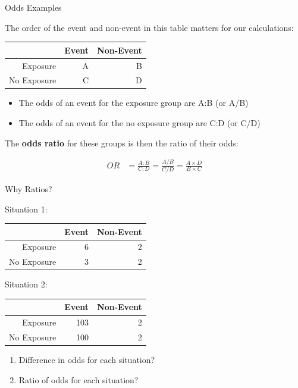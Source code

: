 \documentclass{beamer}
\begin{document}
\begin{frame}{Odds Examples}

The order of the event and non-event in this table matters for our calculations:

\begin{table}[ht]
\centering
\begin{tabular}{|r|r|r|}
  \hline
 & Event & Non-Event \\ 
  \hline
Exposure & A & B \\ \hline
No Exposure & C & D \\
   \hline
\end{tabular}
\end{table}

\begin{itemize}
\item The odds of an event for the exposure group are A:B (or A/B)
\item The odds of an event for the no exposure group are C:D (or C/D)
\end{itemize}

\vspace{6mm}
The \textbf{odds ratio} for these groups is then the ratio of their odds:

\begin{align*}
OR &= \frac{A:B}{C:D} = \frac{A/B}{C/D} = \frac{A \times D}{B \times C}
\end{align*}

\end{frame}


\begin{frame}{Why Ratios?}

Situation 1:
\begin{table}[ht]
\centering
\begin{tabular}{|r|r|r|}
  \hline
 & Event & Non-Event  \\ 
  \hline
Exposure & 6 & 2  \\ \hline
No Exposure & 3 & 2  \\
   \hline
\end{tabular}
\end{table}

Situation 2:
\begin{table}[ht]
\centering
\begin{tabular}{|r|r|r|}
  \hline
 & Event & Non-Event \\ 
  \hline
Exposure & 103 & 2 \\ \hline
No Exposure & 100 & 2 \\
   \hline
\end{tabular}
\end{table}

\begin{enumerate}
\item Difference in odds for each situation?
\item Ratio of odds for each situation?
\end{enumerate}

\end{frame}
\end{document}
